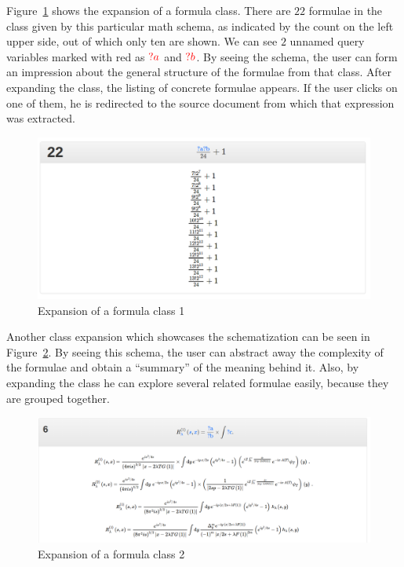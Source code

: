 \documentclass[a4paper,oneside]{article}
\def\red#1{\textcolor{red}{#1}}
\begin{document}
Figure~\ref{fig:schema_instantiation} shows the expansion of a formula class.
There are $22$ formulae in the class given by this particular math schema, as
indicated by the count on the left upper side, out of which only ten are shown.
We can see $2$ unnamed query variables marked with red as $\red{?a}$ and
$\red{?b}$. By seeing the schema, the user can form an impression about the
general structure of the formulae from that class. After expanding the class,
the listing of concrete formulae appears. If the user clicks on one of them, he
is redirected to the source document from which that expression was extracted.

\begin{figure}[ht]\centering
    \includegraphics[width=12.8cm]{img/schemaInstGood.png}
    \caption{Expansion of a formula class 1}\label{fig:schema_instantiation}
\end{figure}
\FloatBarrier

Another class expansion which showcases the schematization can be seen in
Figure~\ref{fig:schema_instantiation3}. By seeing this schema, the user can
abstract away the complexity of the formulae and obtain a ``summary'' of the
meaning behind it. Also, by expanding the class he can explore several related
formulae easily, because they are grouped together.
\begin{figure}[ht]\centering
    \includegraphics[width=12.8cm]{img/schemaInstGood3.png}
    \caption{Expansion of a formula class 2}\label{fig:schema_instantiation3}
\end{figure}
\FloatBarrier
\end{document}
